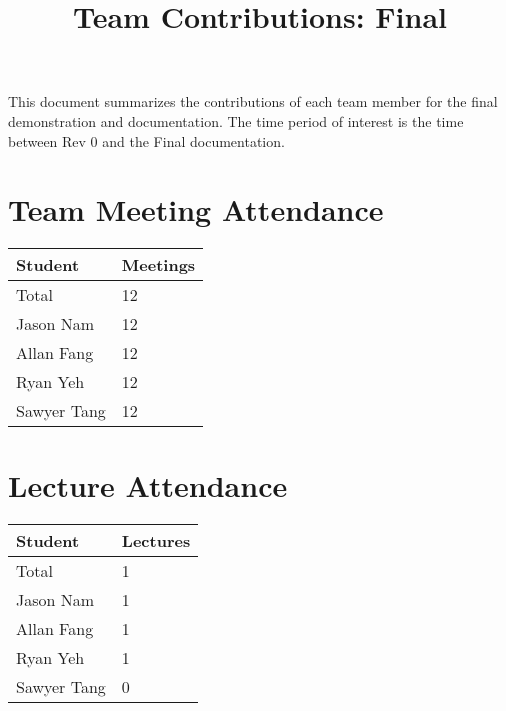 \documentclass{article}
\title{Team Contributions: Final\\\progname}
\author{\authname}
\date{}
\begin{document}
\maketitle

This document summarizes the contributions of each team member for the final
demonstration and documentation.  The time period of interest is the time
between Rev 0 and the Final documentation.

\section{Team Meeting Attendance}


\begin{table}[H]
\centering
\begin{tabular}{ll}
\toprule
\textbf{Student} & \textbf{Meetings}\\
\midrule
Total & 12\\
Jason Nam & 12\\
Allan Fang & 12\\
Ryan Yeh & 12\\
Sawyer Tang & 12\\
\bottomrule
\end{tabular}
\end{table}


\section{Lecture Attendance}


\begin{table}[H]
\centering
\begin{tabular}{ll}
\toprule
\textbf{Student} & \textbf{Lectures}\\
\midrule
Total & 1\\
Jason Nam & 1\\
Allan Fang & 1\\
Ryan Yeh & 1\\
Sawyer Tang & 0\\
\bottomrule
\end{tabular}
\end{table}
\end{document}
